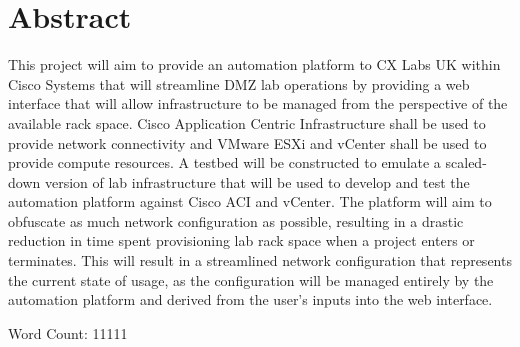 \section*{Abstract}
This project will aim to provide an automation platform to CX Labs UK within Cisco Systems that will streamline DMZ lab operations by providing a web interface that will allow infrastructure to be managed from the perspective of the available rack space. Cisco Application Centric Infrastructure shall be used to provide network connectivity and VMware ESXi and vCenter shall be used to provide compute resources. A testbed will be constructed to emulate a scaled-down version of lab infrastructure that will be used to develop and test the automation platform against Cisco ACI and vCenter. The platform will aim to obfuscate as much network configuration as possible, resulting in a drastic reduction in time spent provisioning lab rack space when a project enters or terminates. This will result in a streamlined network configuration that represents the current state of usage, as the configuration will be managed entirely by the automation platform and derived from the user's inputs into the web interface.



Word Count: 11111